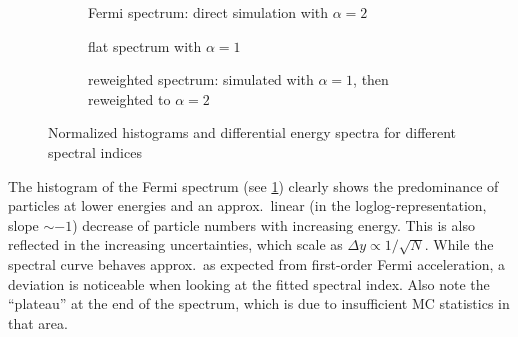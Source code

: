 
\begin{figure}[t!]
    \centering
    \begin{subfigure}[t]{.5\textwidth}
        \centering
        \caption{Fermi spectrum: direct simulation with $\alpha=2$}
        \label{fig:rew-fermi}
        \vspace*{\baselineskip}
    \end{subfigure}
    \begin{subfigure}[t]{.5\textwidth}
        \centering
        \caption{flat spectrum with $\alpha=1$}
        \label{fig:rew-flat}
        \vspace*{\baselineskip}
    \end{subfigure}
    \begin{subfigure}[t]{.5\textwidth}
        \centering
        \caption{reweighted spectrum: simulated with $\alpha=1$, then
            reweighted to $\alpha=2$}
        \label{fig:rew-rew}
    \end{subfigure}

    \caption{Normalized histograms and differential energy spectra for
    different spectral indices}
    \label{fig:rew}
\end{figure}

The histogram of the Fermi spectrum (see \cref{fig:rew-fermi}) clearly shows
the predominance of particles at lower energies and an approx.~linear (in
the loglog-representation, slope $\sim-1$) decrease of particle numbers with
increasing energy. This is also reflected in the increasing uncertainties,
which scale as $\Delta{y}\propto1/\sqrt{N}$.
While the spectral curve behaves approx.~as expected from first-order Fermi
acceleration, a deviation is noticeable when looking at the fitted spectral
index.
Also note the \enquote{plateau} at the end of the spectrum, which is due to
insufficient MC statistics in that area.

